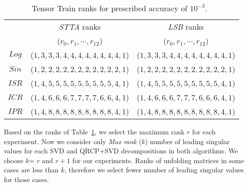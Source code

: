 \documentclass[sigconf]{acmart}
\newcommand{\hthird}{{\it LSB}\xspace}
\newcommand{\otta}{{\it STTA}\xspace}
\begin{document}
\begin{table}[htb]
	\begin{center}
	{\small\begin{tabular}{|c|c|c|}
			\hline
			&\otta ranks & \hthird ranks\\
			& ($r_0,r_1,\cdots, r_{12}$) & ($r_0,r_1,\cdots, r_{12}$)\\ \hline
			$Log$ & ($1, 3, 3, 3, 4, 4, 4, 4, 4, 4, 4, 4, 1$) & ($1, 3, 3, 3, 4, 4, 4, 4, 4, 4, 4, 4, 1$)\\ \hline
			$Sin$ & ($1, 2, 2, 2, 2, 2, 2, 2, 2, 2, 2, 2, 1$) & ($1, 2, 2, 2, 2, 2, 2, 2, 2, 2, 2, 2, 1$)\\ \hline
			$ISR$ & ($1, 4, 5, 5, 5, 5, 5, 5, 5, 5, 5, 4, 1$) & ($1, 4, 5, 5, 5, 5, 5, 5, 5, 5, 5, 4, 1$)\\ \hline
			$ICR$ & ($1, 4, 6, 6, 6, 7, 7, 7, 7, 6, 6, 4, 1$) & ($1, 4, 6, 6, 6, 7, 7, 7, 6, 6, 6, 4, 1$)\\ \hline
			$IPR$ & ($1, 4, 8, 8, 8, 8, 8, 8, 8, 8, 8, 4, 1$) & ($1, 4, 8, 8, 8, 8, 8, 8, 8, 8, 8, 4, 1$)\\ \hline			
		\end{tabular}}
		\caption{Tensor Train ranks for prescribed accuracy of $10^{-3}$.~\label{tab:12-dim-ranks-e-3}}
	\end{center}
\end{table}

Based on the ranks of Table~\ref{tab:12-dim-ranks-e-3}, we select the maximum rank $r$ for each experiment. Now we consider only \emph{Max rank} ($k$) number of leading singular values for each SVD and QRCP+SVD decompositions in both algorithms. We choose $k$= $r$ and $r+1$ for our experiments. Ranks of unfolding matrices in some cases are less than $k$, therefore we select fewer number of leading singular values for those cases.



\end{document}
